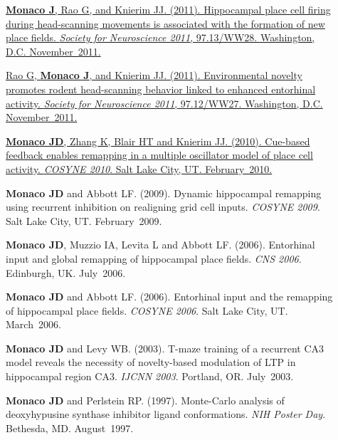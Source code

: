 \documentclass[10pt]{article}
\begin{document}
\begin{description}
\item[\quad] \href{http://www.abstractsonline.com/Plan/ViewAbstract.aspx?sKey=c48e9f5f-1274-4486-85bf-38ee591629e1&cKey=190bd951-c183-428d-a4c5-01eb61556d79&mKey=\%7b8334BE29-8911-4991-8C31-32B32DD5E6C8\%7d}{\textbf{Monaco J}, Rao G, and Knierim JJ. (2011). Hippocampal place cell firing during head-scanning movements is associated with the formation of new place fields. \emph{Society for Neuroscience 2011}, 97.13/WW28. Washington, D.C. November~2011.}
\item[\quad] \href{http://www.abstractsonline.com/Plan/ViewAbstract.aspx?sKey=c48e9f5f-1274-4486-85bf-38ee591629e1&cKey=3ec26e6f-8c59-4be2-bad3-e1572d75e07e&mKey=\%7b8334BE29-8911-4991-8C31-32B32DD5E6C8\%7d}{Rao G, \textbf{Monaco J}, and Knierim JJ. (2011). Environmental novelty promotes rodent head-scanning behavior linked to enhanced entorhinal activity. \emph{Society for Neuroscience 2011}, 97.12/WW27. Washington, D.C. November~2011.}
\item[\quad] \href{http://www.frontiersin.org/10.3389/conf.fnins.2010.03.00192/event_abstract}{\textbf{Monaco JD}, Zhang K, Blair HT and Knierim JJ. (2010). Cue-based feedback enables remapping in a multiple oscillator model of place cell activity. \emph{COSYNE 2010}. Salt Lake City, UT. February~2010.}
\item[\quad] \textbf{Monaco JD} and Abbott LF. (2009). Dynamic hippocampal remapping using recurrent inhibition on realigning grid cell inputs. \emph{COSYNE 2009}. Salt Lake City, UT. February~2009.
\item[\quad] \textbf{Monaco JD}, Muzzio IA, Levita L and Abbott LF. (2006). Entorhinal input and global remapping of hippocampal place fields. \emph{CNS 2006}. Edinburgh, UK. July~2006.
\item[\quad] \textbf{Monaco JD} and Abbott LF. (2006). Entorhinal input and the remapping of hippocampal place fields. \emph{COSYNE 2006}. Salt Lake City, UT. March~2006.
\item[\quad] \textbf{Monaco JD} and Levy WB. (2003). T-maze training of a recurrent CA3 model reveals the necessity of novelty-based modulation of LTP in hippocampal region CA3. \emph{IJCNN 2003}. Portland, OR. July~2003.
\item[\quad] \textbf{Monaco JD} and Perlstein RP. (1997). Monte-Carlo analysis of deoxyhypusine synthase inhibitor ligand conformations. \emph{NIH Poster Day}. Bethesda, MD. August~1997. 
\end{description}
\end{document}
